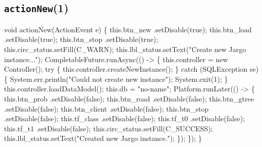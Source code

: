 \subsection{\texttt{actionNew}(1)}
\nwenddocs{}\endmoddef{}
void actionNew(ActionEvent e) \{
  this.btn_new      .setDisable(true);
  this.btn_load     .setDisable(true);
  this.btn_stop     .setDisable(true);
  this.circ_status.setFill(C_WARN);
  this.lbl_status.setText("Create new Jargo instance...");
  CompletableFuture.runAsync(() -> \{
    this.controller = new Controller();
    try \{
      this.controller.createNewInstance();
    \} catch (SQLException se) \{
      System.err.println("Could not create new instance");
      System.exit(1);
    \}
    this.controller.loadDataModel();
    this.db = "no-name";
    Platform.runLater(() -> \{
      this.btn_prob     .setDisable(false);
      this.btn_road     .setDisable(false);
      this.btn_gtree    .setDisable(false);
      this.btn_client   .setDisable(false);
      this.btn_stop     .setDisable(false);
      this.tf_class     .setDisable(false);
      this.tf_t0        .setDisable(false);
      this.tf_t1        .setDisable(false);
      this.circ_status.setFill(C_SUCCESS);
      this.lbl_status.setText("Created new Jargo instance.");
    \});
  \});
\}
\eatline
{}\nwendcode{}\nwdocspar
